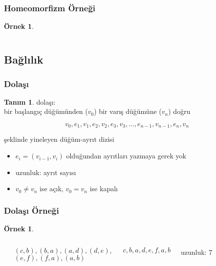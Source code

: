 \documentclass[dvipsnames]{beamer}
\theoremstyle{definition}
\newtheorem{tanim}[theorem]{Tanım}
\theoremstyle{example}
\newtheorem{ornek}[theorem]{Örnek}
\theoremstyle{plain}
\begin{document}
\begin{frame}
  \frametitle{Homeomorfizm Örneği}

  \begin{ornek}
    \begin{columns}
      \begin{center}
      \end{center}

      \begin{center}
      \end{center}
    \end{columns}
  \end{ornek}
\end{frame}

\subsection{Bağlılık}

\begin{frame}
  \frametitle{Dolaşı}

  \begin{tanim}
    \alert{dolaşı}:\\
    bir başlangıç düğümünden ($v_0$) bir varış düğümüne ($v_n$) doğru

    \[
      v_0,e_1,v_1,e_2,v_2,e_3,v_3,\dots,e_{n-1},v_{n-1},e_n,v_n
    \]

    şeklinde yineleyen düğüm-ayrıt dizisi
  \end{tanim}

  \pause
  \begin{itemize}
    \item $e_i=(v_{i-1},v_i)$ olduğundan ayrıtları yazmaya gerek yok

    \pause
    \medskip
    \item \alert{uzunluk}: ayrıt sayısı
    \item $v_0 \neq v_n$ ise \alert{açık}, $v_0 = v_n$ ise \alert{kapalı}
  \end{itemize}
\end{frame}

\begin{frame}
  \frametitle{Dolaşı Örneği}

  \begin{ornek}
    \begin{columns}
      \begin{center}
      \end{center}

      $(c,b),(b,a),(a,d),(d,e),$\\
      $(e,f),(f,a),(a,b)$

      \medskip
      $c,b,a,d,e,f,a,b$

      \bigskip
      uzunluk: 7
    \end{columns}
  \end{ornek}
\end{frame}
\end{document}
